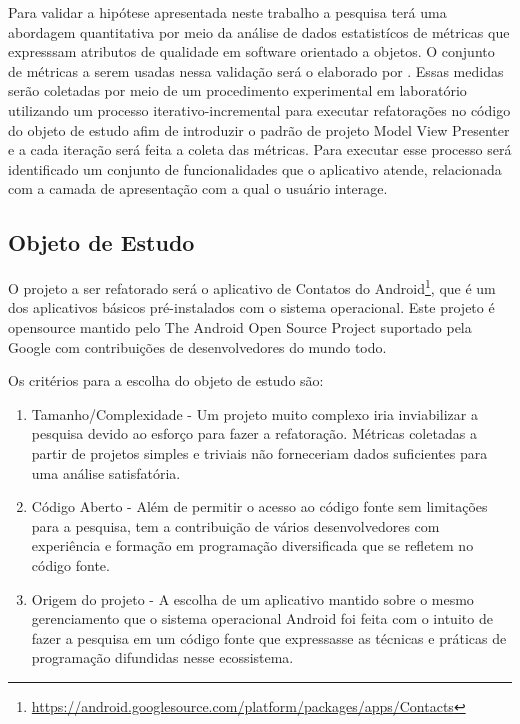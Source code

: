 \documentclass[conference]{IEEEtran}
\begin{document}
Para validar a hipótese apresentada neste trabalho a pesquisa terá uma
abordagem quantitativa por meio da análise de dados estatistícos de métricas 
que expresssam atributos de qualidade em software orientado a objetos. O
conjunto de métricas a serem usadas nessa validação será o elaborado por
\cite{cksuite}. Essas medidas serão coletadas por meio de um procedimento
experimental em laboratório utilizando um processo iterativo-incremental para
executar refatorações no código do objeto de estudo afim de introduzir o padrão
de projeto Model View Presenter e a cada iteração será feita a coleta das
métricas. Para executar esse processo será identificado um conjunto de
funcionalidades que o aplicativo atende, relacionada com a camada de
apresentação com a qual o usuário interage.

\subsection{Objeto de Estudo}


O projeto a ser refatorado será o aplicativo de Contatos do
Android\footnote{\url{https://android.googlesource.com/platform/packages/apps/Contacts}},
que é um dos aplicativos básicos pré-instalados com o sistema operacional. Este
projeto é opensource mantido pelo  The Android Open Source Project suportado
pela Google com contribuições de desenvolvedores do mundo todo.

Os critérios para a escolha do objeto de estudo são:

\begin{enumerate}
  \item Tamanho/Complexidade - Um projeto muito complexo iria inviabilizar a
  pesquisa devido ao esforço para fazer a refatoração. Métricas coletadas
  a partir de projetos simples e triviais não forneceriam dados suficientes para
  uma análise satisfatória.
  \item Código Aberto - Além de permitir o acesso ao código fonte sem
  limitações para a pesquisa, tem a contribuição de vários desenvolvedores com
  experiência e formação em programação diversificada que se refletem no código fonte.
  \item Origem do projeto - A escolha de um aplicativo mantido sobre o mesmo
  gerenciamento que o sistema operacional Android foi feita com o intuito de
  fazer a pesquisa em um código fonte que expressasse as técnicas e práticas de
  programação difundidas nesse ecossistema.
\end{enumerate}
\end{document}
